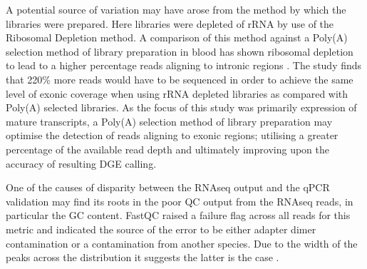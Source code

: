 A potential source of variation may have arose from the method by which the libraries were prepared. Here libraries were depleted of rRNA by use of the Ribosomal Depletion method. A comparison of this method against a Poly(A) selection method of library preparation in blood has shown ribosomal depletion to lead to a higher percentage reads aligning to intronic regions \cite{Zhao2018}. The study finds that 220\% more reads would have to be sequenced in order to achieve the same level of exonic coverage when using rRNA depleted libraries as compared with Poly(A) selected libraries. As the focus of this study was primarily expression of mature transcripts, a Poly(A) selection method of library preparation may optimise the detection of reads aligning to exonic regions; utilising a greater percentage of the available read depth and ultimately improving upon the accuracy of resulting DGE calling.  

One of the causes of disparity between the RNAseq output and the qPCR validation may find its roots in the poor QC output from the RNAseq reads, in particular the GC content. FastQC raised a failure flag across all reads for this metric and indicated the source of the error to be either adapter dimer contamination or a contamination from another species. Due to the width of the peaks across the distribution it suggests the latter is the case \cite{BabrahamBioinformatics}. 

